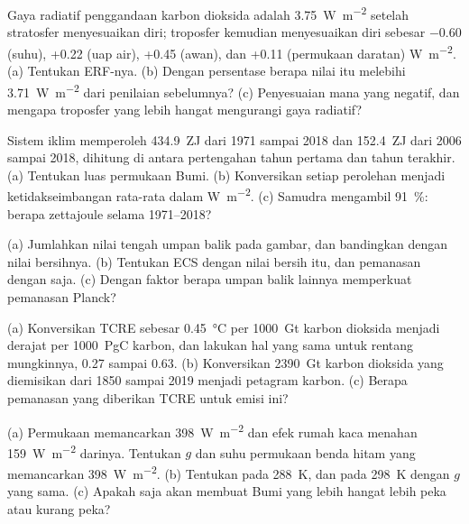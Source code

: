 \begin{exercise}[$\star$]\label{exo:b2:anthropogenic-climate-change:1}
Gaya radiatif penggandaan karbon dioksida adalah \qty{3.75}{W.m^{-2}} setelah stratosfer menyesuaikan diri;
troposfer kemudian menyesuaikan diri sebesar $-0.60$ (suhu), +0.22 (uap air), +0.45 (awan), dan
+0.11 (permukaan daratan) \unit{W.m^{-2}}. (a) Tentukan ERF-nya. (b) Dengan persentase berapa nilai itu melebihi
\qty{3.71}{W.m^{-2}} dari penilaian sebelumnya? (c) Penyesuaian mana yang negatif, dan mengapa troposfer yang lebih hangat
mengurangi gaya radiatif?
\end{exercise}

\begin{exercise}[$\star$]\label{exo:b2:anthropogenic-climate-change:2}
Sistem iklim memperoleh \qty{434.9}{ZJ} dari 1971 sampai 2018 dan \qty{152.4}{ZJ} dari 2006 sampai 2018,
dihitung di antara pertengahan tahun pertama dan tahun terakhir. (a) Tentukan luas permukaan Bumi.
(b) Konversikan setiap perolehan menjadi ketidakseimbangan rata-rata dalam \unit{W.m^{-2}}. (c) Samudra mengambil
\qty{91}{\percent}: berapa zettajoule selama 1971--2018?
\end{exercise}

\begin{exercise}[$\star$]\label{exo:b2:anthropogenic-climate-change:3}
(a) Jumlahkan nilai tengah umpan balik pada gambar, dan bandingkan dengan nilai bersihnya. (b) Tentukan
ECS dengan nilai bersih itu, dan pemanasan dengan  saja. (c) Dengan faktor berapa
umpan balik lainnya memperkuat pemanasan Planck?
\end{exercise}

\begin{exercise}[$\star$]\label{exo:b2:anthropogenic-climate-change:4}
(a) Konversikan TCRE sebesar \qty{0.45}{\celsius} per \qty{1000}{Gt} karbon dioksida menjadi derajat per
\qty{1000}{PgC} karbon, dan lakukan hal yang sama untuk rentang mungkinnya, 0.27 sampai 0.63. (b) Konversikan
\qty{2390}{Gt} karbon dioksida yang diemisikan dari 1850 sampai 2019 menjadi petagram karbon. (c) Berapa
pemanasan yang diberikan TCRE untuk emisi ini?
\end{exercise}

\begin{exercise}[$\star\star$]\label{exo:b2:anthropogenic-climate-change:5}
(a) Permukaan memancarkan \qty{398}{W.m^{-2}} dan efek rumah kaca menahan \qty{159}{W.m^{-2}} darinya.
Tentukan $g$ dan suhu permukaan benda hitam yang memancarkan \qty{398}{W.m^{-2}}. (b) Tentukan
 pada \qty{288}{K}, dan pada \qty{298}{K} dengan $g$ yang sama. (c) Apakah  saja akan membuat Bumi yang lebih hangat lebih peka atau kurang peka?
\end{exercise}

